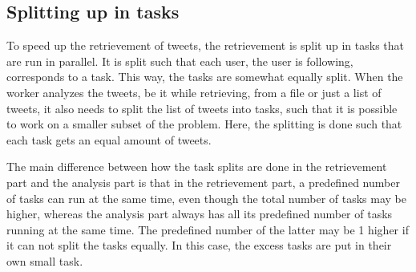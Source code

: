 \subsection{Splitting up in tasks}  To speed up the retrievement of tweets, the
retrievement is split up in tasks that are run in parallel. It is split such
that each user, the user is following, corresponds to a task. This way, the
tasks are somewhat equally split.
When the worker analyzes the tweets, be it while retrieving, from a file or just
a list of tweets, it also needs to split the list of tweets into tasks, such
that it is possible to work on a smaller subset of the problem. Here, the
splitting is done such that each task gets an equal amount of tweets.

The main difference between how the task splits are done in the retrievement
part and the analysis part is that in the retrievement part, a predefined number
of tasks can run at the same time, even though the total number of tasks may be
higher, whereas the analysis part always has all its predefined number of tasks
running at the same time. The predefined number of the latter may be 1 higher if
it can not split the tasks equally. In this case, the excess tasks are
put in their own small task. 

